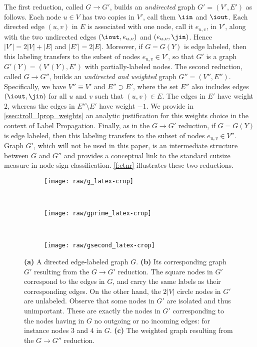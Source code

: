 The first reduction, called $G \rightarrow G'$, builds an \emph{undirected} graph $G' = (V',E')$ as
follows. Each node $u \in V$ has two copies in $V'$, call them $\iin$ and $\iout$. Each directed
edge $(u,v)$ in $E$ is associated with one node, call it $e_{u,v}$, in $V'$, along with the two
undirected edges $(\iout,e_{u,v})$ and $(e_{u,v},\jin)$. Hence $|V'| = 2|V|+|E|$ and $|E'| = 2|E|$.
Moreover, if $G = G(Y)$ is edge labeled, then this labeling transfers to the subset of nodes
$e_{u,v} \in V'$, so that $G'$ is a graph $G'(Y) = (V'(Y),E')$ with partially-labeled nodes. The
second reduction, called $G \rightarrow G''$, builds an \emph{undirected and weighted} graph $G'' =
(V'',E'')$. Specifically, we have $V'' \equiv V'$ and $E'' \supset E'$, where the set $E''$ also
includes edges $(\iout,\jin)$ for all $u$ and $v$ such that $(u,v) \in E$. The edges in $E'$ have
weight $2$, whereas the edges in $E''\setminus E'$ have weight $-1$. We provide in
\autoref{ssec:troll_lprop_weights} an analytic justification for this weights choice in the context
of Label Propagation. Finally, as in the $G \rightarrow G'$ reduction, if $G = G(Y)$ is edge
labeled, then this labeling transfers to the subset of nodes $e_{u,v} \in V''$. Graph $G'$, which
will not be used in this paper, is an intermediate structure between $G$ and $G''$ and provides a
conceptual link to the standard cutsize measure in node sign classification. \autoref{f:etnr}
illustrates these two reductions. 

\begin{figure*}[t]
  \centering
  \begin{subfigure}[b]{0.28\textwidth}
    \centering \texttt{[image: raw/g\_latex-crop]} \caption{}
  \end{subfigure}~
  \begin{subfigure}[b]{0.30\textwidth}
    \centering \texttt{[image: raw/gprime\_latex-crop]}
    \caption{\label{fig:troll_reduction_gprime}}
  \end{subfigure}~
  \begin{subfigure}[b]{0.36\textwidth}
    \centering \texttt{[image: raw/gsecond\_latex-crop]}
    \caption{\label{fig:troll_reduction_gsecond}}
  \end{subfigure}
  \caption{\label{f:etnr}
    \textbf{(a)} A directed edge-labeled graph $G$. \textbf{(b)} Its corresponding graph $G'$
    resulting from the $G\rightarrow G'$ reduction. The square nodes in $G'$ correspond to the
    edges in $G$, and carry the same labels as their corresponding edges. On the other hand, the
    $2|V|$ circle nodes in $G'$ are unlabeled. Observe that some nodes in $G'$ are isolated and
    thus unimportant. These are exactly the nodes in $G'$ corresponding to the nodes having in $G$
    no outgoing or no incoming edges: for instance nodes $3$ and $4$ in $G$. \textbf{(c)} The
    weighted graph resulting from the $G\rightarrow G''$ reduction.
  }
\end{figure*}

